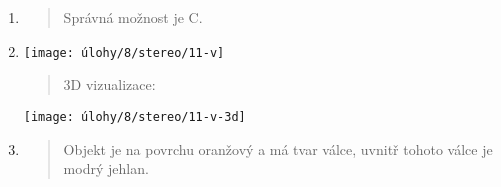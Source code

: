 \begin{enumerate}
    \item
    \begin{quote}
        Správná možnost je C.
    \end{quote}

    \item
    \begin{minipage}[t]{\linewidth}
        \begin{quote}
            \phantom{text}
        \end{quote}
        \centering
        \texttt{[image: úlohy/8/stereo/11-v]}
        \begin{quote}
            3D vizualizace:
        \end{quote}
        \centering
        \texttt{[image: úlohy/8/stereo/11-v-3d]}
    \end{minipage}

    \item
    \begin{quote}
        Objekt je na povrchu oranžový a má tvar válce, uvnitř tohoto válce je modrý jehlan.
    \end{quote}
\end{enumerate}